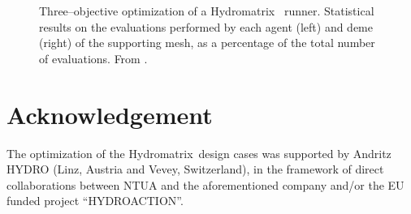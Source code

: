 \documentclass{vki_ls}
\begin{document}
\begin{figure}[h!]
\begin{minipage}{.49\linewidth}
    \end{minipage}
    \caption{Three--objective optimization of a Hydromatrix\textregistered~ 
	     runner. Statistical results on the evaluations performed by each
             agent (left) and deme (right) of the supporting mesh, as a 
             percentage of the total number of evaluations. 
             From \cite{LTT_3_104}.}
    \label{f:amaeaStats}
\end{figure}
%


\section*{Acknowledgement}

The optimization of the Hydromatrix\textregistered~design cases was supported by Andritz HYDRO (Linz, Austria and Vevey, Switzerland), in the framework of direct collaborations between NTUA and the aforementioned company and/or the EU funded project ``HYDROACTION''.

%
%





\end{document}
